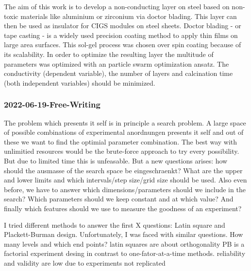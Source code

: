 The aim of this work is to develop a non-conducting layer on steel based on  non-toxic materials like aluminium or zirconium via doctor blading. 
This layer can then be used as insulator for CIGS modules on steel sheets.
Doctor blading - or tape casting - is a widely used precision coating method to apply thin films on large area surfaces\cite{Berni2004}.
This sol-gel process was chosen over spin coating because of 
its scalability.
In order to optimize the resulting layer the multitude of parameters was optimized with an particle swarm optimization ansatz. %
The conductivity (dependent variable), the number of layers and calcination time (both independent variables) should be minimized.
\iffalse
Defensio: Argumente in der Arbeit noch mal sichten, Feedback von Betreuungsperson im Kopf haben - da könnten Fragen kommen, 
sich selbst aufnehmen 

Präsentieren: Visualisierungen sinnvoll? 
Antworten überlegen/Argumente überlegen
Limitation, Rahmen der Arbeit
Begründung für die eigene Vorgehensweise
\fi
\subsubsection{2022-06-19-Free-Writing}
The problem which presents it self is in principle a search problem.
A large space of possible combinations of experimental anordnungen presents it self
and out of these we want to find the optimial parameter combination. 
The best way with unlimitied resources would be the brute-force approach to try every possibility. 
But due to limited time this is unfeasable. 
But a new questions arises: how should the ausmasse of the search space be eingeschraenkt? 
What are the upper and lower limits and which intervals/step size/grid size should be used. 
Also even before, we have to answer which dimensions/parameters should we include in the search? 
Which parameters should we keep constant and at which value? 
And finally which features should we use to measure the goodness of an experiment? 

I tried different methods to answer the first X questions: Latin square and Plackett-Burman design.
Unfortunately, I was faced with similar questions. How many levels and which end points? 
latin squares are about orthogonality 
PB is a factorial experiment desing in contrast to one-fator-at-a-time methods.
reliability and validity are low due to experiments not replicated 

